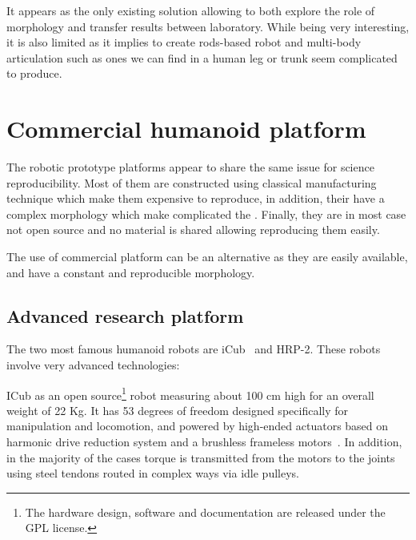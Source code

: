 \begin{figure}[tb]
\centering
    \hfil
    \caption{}
    \label{fig:locokit}
\end{figure}

It appears as the only existing solution allowing to both explore the role of morphology and transfer results between laboratory. While being very interesting, it is also limited as it implies to create rods-based robot and multi-body articulation such as ones we can find in a human leg or trunk seem complicated to produce.


\section{Commercial humanoid platform} %

The robotic prototype platforms appear to share the same issue for science reproducibility. Most of them are constructed using classical manufacturing technique which make them expensive to reproduce, in addition, their have a complex morphology which make complicated the . Finally, they are in most case not open source and no material is shared allowing reproducing them easily.

The use of commercial platform can be an alternative as they are easily available, and have a constant and reproducible morphology.

\subsection{Advanced research platform} %

The two most famous humanoid robots are iCub~\parencite{metta2008icub} and HRP-2. These robots involve very advanced technologies:

ICub as an open source\footnote{The hardware design, software and documentation are released under the GPL license.} robot measuring about 100 cm high for an overall weight of 22 Kg. It has 53 degrees of freedom designed specifically for manipulation and locomotion, and powered by high-ended actuators based on harmonic drive reduction system and a brushless frameless motors~\parencite{natale2013icub}. In addition, in the majority of the cases torque is transmitted from the motors to the joints using steel tendons routed in complex ways via idle pulleys.


